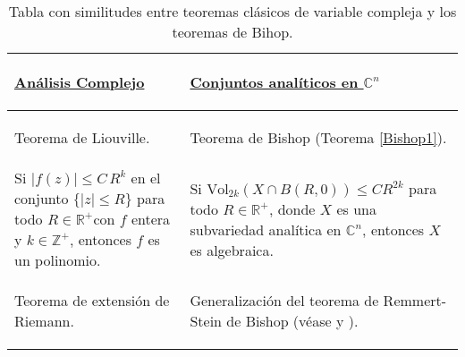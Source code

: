 \documentclass{article}
\newcommand{\zah}{\ensuremath{ \mathbb Z }}
\newcommand{\con}{\ensuremath{\mathbb{C}^n}}
\newcommand{\re}{\ensuremath{\mathbb R }}
\begin{document}
\begin{table}[hpt]
        \caption{Tabla con similitudes entre teoremas cl\'asicos de variable compleja y los teoremas de Bihop.}\label{Tab}
        \centering
        \begin{tabular}{|m{5.5cm}|m{5.5cm}|} \hline
                        \begin{center} \vspace*{0.2cm} 
                                \underline{\textbf{An\'alisis Complejo}} 
                        \end{center} & 
                        \begin{center} \vspace*{0.2cm}
                                \underline{\textbf{Conjuntos anal\'iticos en $\con$}}
                        \end{center} \\
                \hline
                \begin{center} 
                        Teorema de Liouville. 
                \end{center} & 
                \begin{center}
                        Teorema de Bishop (Teorema \ref{Bishop1}).
                \end{center}\\ 
                        \hline Si $\vert f(z)\vert\leq C\,R^k$ en el conjunto $\{\vert z\vert\leq R\}$ 
                        para todo $R\in\re^{+}$con $f$ entera y $k\in\zah^{+}$, entonces 
                        $f$ es un polinomio. 
                        &
                        \vspace{0.1cm}
                        Si $\textrm{Vol}_{2k}(X\cap B(R,0))\leq CR^{2k}$ para todo
                        $R\in\re^{+}$, donde $X$ es una subvariedad anal\'itica en $\con$, entonces $X$ es algebraica.\\ 
                        \hline
                        \vspace{0.1cm}
                        \begin{center} 
                        Teorema de extensi\'on de Riemann. 
                \end{center} 
                        & 
                \begin{center} 
                        Generalizaci\'on del teorema de Remmert-Stein de Bishop (v\'ease \cite{R-S} y \cite[p. 34]{Stolzenberg}). 
                \end{center} \\ 

\end{tabular}
\end{table}
\end{document}
